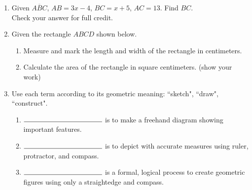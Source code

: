 \documentclass[12pt, twoside]{article}
\begin{document}
\begin{enumerate}
\newpage
  \item Given $\overline{ABC}$, $AB=3x-4$, $BC=x+5$, $AC=13$. Find ${BC}$. \\ 
    Check your answer for full credit.
    \vspace{1cm}
      \begin{center}
      \end{center} \vspace{7cm}

  \item Given the rectangle $ABCD$ shown below.
  \begin{enumerate}
    \item Measure and mark the length and width of the rectangle in centimeters.
    \item Calculate the area of the rectangle in square centimeters. (show your work)
  \end{enumerate}
  \vspace{1cm}
  \begin{center}
  \end{center}

\newpage
  \item Use each term according to its geometric meaning: ``sketch", ``draw", ``construct".
  \begin{enumerate}
    \item $\rule{4cm}{0.15mm}$ is to make a freehand diagram showing important features. \smallskip
    \item $\rule{4cm}{0.15mm}$ is to depict with accurate measures using ruler, protractor, and compass. \smallskip
    \item $\rule{4cm}{0.15mm}$ is a formal, logical process to create geometric figures using only a straightedge and compass.
  \end{enumerate} \smallskip


\end{enumerate}
\end{document}
